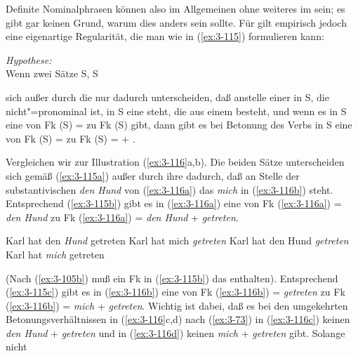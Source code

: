 \documentclass[output=paper]{langsci/langscibook}
\begin{document}
Definite Nominalphrasen können also im Allgemeinen ohne weiteres im 
sein; es gibt gar keinen Grund, warum dies anders sein sollte. Für
 gilt empirisch jedoch eine eigenartige Regularität,
die man wie in (\ref{ex:3-115}) formulieren kann:
\begin{exe}
\ex
\label{ex:3-115}
\textit{Hypothese:}\\
Wenn zwei Sätze S, S
\begin{xlist}
\ex
\label{ex:3-115a}
sich außer durch die  nur dadurch unterscheiden, daß anstelle
einer  in S, die nicht"=pronominal ist, in S eine  steht,
die aus einem  besteht, und wenn es
\ex
\label{ex:3-115b}
in S eine  von Fk (S) =  zu Fk
(S) gibt, dann gibt es \ex
\label{ex:3-115c}
bei Betonung des Verbs in S eine  von Fk (S)
=  zu Fk (S) =  + .
\end{xlist}
\end{exe}
Vergleichen wir zur Illustration (\ref{ex:3-116}a,b). Die beiden Sätze
unterscheiden sich gemäß (\ref{ex:3-115a}) außer durch ihre  dadurch,
daß an Stelle der substantivischen  \textit{den Hund} von (\ref{ex:3-116a}) das
 \textit{mich} in (\ref{ex:3-116b}) steht. Entsprechend (\ref{ex:3-115b}) gibt es
in (\ref{ex:3-116a}) eine  von Fk (\ref{ex:3-116a}) = \textit{den Hund} zu Fk
(\ref{ex:3-116a}) = \textit{den Hund} + \textit{getreten}.
\begin{exe}
\ex
\label{ex:3-116}
\begin{xlist}
\ex
\label{ex:3-116a}
Karl hat den \textit{Hund} getreten
\ex
\label{ex:3-116b}
Karl hat mich \textit{getreten}
\ex
\label{ex:3-116c}
Karl hat den Hund \textit{getreten}
\ex
\label{ex:3-116d}
Karl hat \textit{mich} getreten
\end{xlist}
\end{exe}
(Nach (\ref{ex:3-105b}) muß ein Fk in (\ref{ex:3-115b}) das 
enthalten). Entsprechend (\ref{ex:3-115c}) gibt es in (\ref{ex:3-116b}) eine
 von Fk (\ref{ex:3-116b}) = \textit{getreten} zu Fk (\ref{ex:3-116b})
= \textit{mich} + \textit{getreten}. Wichtig ist dabei, daß es bei den umgekehrten Betonungsverhältnissen in (\ref{ex:3-116}c,d) nach (\ref{ex:3-73}) in (\ref{ex:3-116c}) keinen  \textit{den Hund} + \textit{getreten} und in (\ref{ex:3-116d}) keinen  \textit{mich} + \textit{getreten} gibt. Solange nicht
\end{document}
